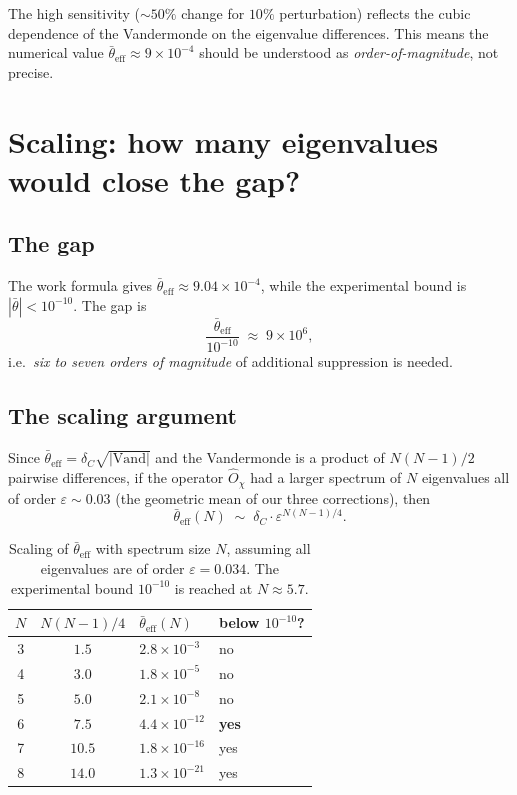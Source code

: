 \documentclass[11pt,a4paper]{article}
\newcommand{\dC}{\delta_C}
\newcommand{\Opchi}{\hat{O}_\chi}
\theoremstyle{plain}
\theoremstyle{definition}
\theoremstyle{remark}
\begin{document}
The high sensitivity ($\sim 50\%$ change for $10\%$ perturbation)
reflects the cubic dependence of the Vandermonde on the eigenvalue
differences.  This means the numerical value $\bar\theta_{\mathrm{eff}}
\approx 9 \times 10^{-4}$ should be understood as
\emph{order-of-magnitude}, not precise.

\section{Scaling: how many eigenvalues would close the gap?}
\label{sec:scaling}

\subsection{The gap}

The work formula gives $\bar\theta_{\mathrm{eff}} \approx 9.04 \times
10^{-4}$, while the experimental bound is $|\bar\theta| < 10^{-10}$.
The gap is
\begin{equation}
  \frac{\bar\theta_{\mathrm{eff}}}{10^{-10}}
  \;\approx\; 9 \times 10^{6},
\end{equation}
i.e.\ \emph{six to seven orders of magnitude} of additional suppression
is needed.

\subsection{The scaling argument}

Since $\bar\theta_{\mathrm{eff}} = \dC \sqrt{|\mathrm{Vand}|}$ and the
Vandermonde is a product of $N(N-1)/2$ pairwise differences, if the
operator $\Opchi$ had a larger spectrum of $N$ eigenvalues all of
order $\varepsilon \sim 0.03$ (the geometric mean of our three
corrections), then
\begin{equation}\label{eq:scaling}
  \bar\theta_{\mathrm{eff}}(N) \;\sim\; \dC \cdot \varepsilon^{N(N-1)/4}.
\end{equation}

\begin{table}[h]
\centering
\small
\begin{tabular}{c c l l}
\toprule
$N$ & $N(N-1)/4$ & $\bar\theta_{\mathrm{eff}}(N)$ & below $10^{-10}$? \\
\midrule
3 & $1.5$  & $2.8 \times 10^{-3}$  & no \\
4 & $3.0$  & $1.8 \times 10^{-5}$  & no \\
5 & $5.0$  & $2.1 \times 10^{-8}$  & no \\
6 & $7.5$  & $4.4 \times 10^{-12}$ & \textbf{yes} \\
7 & $10.5$ & $1.8 \times 10^{-16}$ & yes \\
8 & $14.0$ & $1.3 \times 10^{-21}$ & yes \\
\bottomrule
\end{tabular}
\caption{Scaling of $\bar\theta_{\mathrm{eff}}$ with spectrum size $N$,
assuming all eigenvalues are of order $\varepsilon = 0.034$.  The
experimental bound $10^{-10}$ is reached at $N \approx 5.7$.}
\label{tab:scaling}
\end{table}
\end{document}
